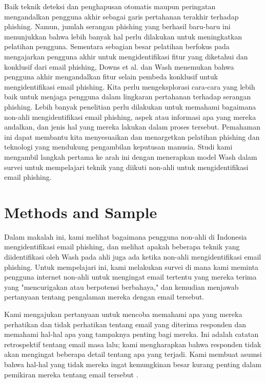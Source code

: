 \documentclass[lettersize,journal]{IEEEtran}
\begin{document}
Baik teknik deteksi dan penghapusan otomatis maupun peringatan mengandalkan
pengguna akhir sebagai garis pertahanan terakhir terhadap phishing. Namun,
jumlah serangan phishing yang berhasil baru-baru ini menunjukkan bahwa lebih
banyak hal perlu dilakukan untuk meningkatkan pelatihan pengguna. Sementara
sebagian besar pelatihan berfokus pada mengajarkan pengguna akhir untuk
mengidentifikasi fitur yang diketahui dan konklusif dari email phishing, Downs
et al. \cite{tujuh} dan Wash \cite{tigaempat} menemukan bahwa pengguna akhir
mengandalkan fitur selain pembeda konklusif untuk mengidentifikasi email
phishing. Kita perlu mengeksplorasi cara-cara yang lebih baik untuk menjaga
pengguna dalam lingkaran pertahanan terhadap serangan phishing. Lebih banyak
penelitian perlu dilakukan untuk memahami bagaimana non-ahli mengidentifikasi
email phishing, aspek atau informasi apa yang mereka andalkan, dan jenis hal
yang mereka lakukan dalam proses tersebut. Pemahaman ini dapat membantu kita
menyesuaikan dan menargetkan pelatihan phishing dan teknologi yang mendukung
pengambilan keputusan manusia. Studi kami mengambil langkah pertama ke arah ini
dengan menerapkan model Wash dalam survei untuk mempelajari teknik yang diikuti
non-ahli untuk mengidentifikasi email phishing.

\section{Methods and Sample}

Dalam makalah ini, kami melihat bagaimana pengguna non-ahli di Indonesia
mengidentifikasi email phishing, dan melihat apakah beberapa teknik yang
diidentifikasi oleh Wash \cite{tigaempat} pada ahli juga ada ketika non-ahli
mengidentifikasi email phishing. Untuk mempelajari ini, kami melakukan survei
di mana kami meminta pengguna internet non-ahli untuk mengingat email tertentu
yang mereka terima yang "mencurigakan atau berpotensi berbahaya," dan kemudian
menjawab pertanyaan tentang pengalaman mereka dengan email tersebut.

Kami mengajukan pertanyaan untuk mencoba memahami apa yang mereka perhatikan
dan tidak perhatikan tentang email yang diterima responden dan memahami hal-hal
apa yang tampaknya penting bagi mereka. Ini adalah catatan retrospektif tentang
email masa lalu; kami mengharapkan bahwa responden tidak akan mengingat
beberapa detail tentang apa yang terjadi. Kami membuat asumsi bahwa hal-hal
yang tidak mereka ingat kemungkinan besar kurang penting dalam pemikiran mereka
tentang email tersebut \cite{satudelapan}.
\end{document}
